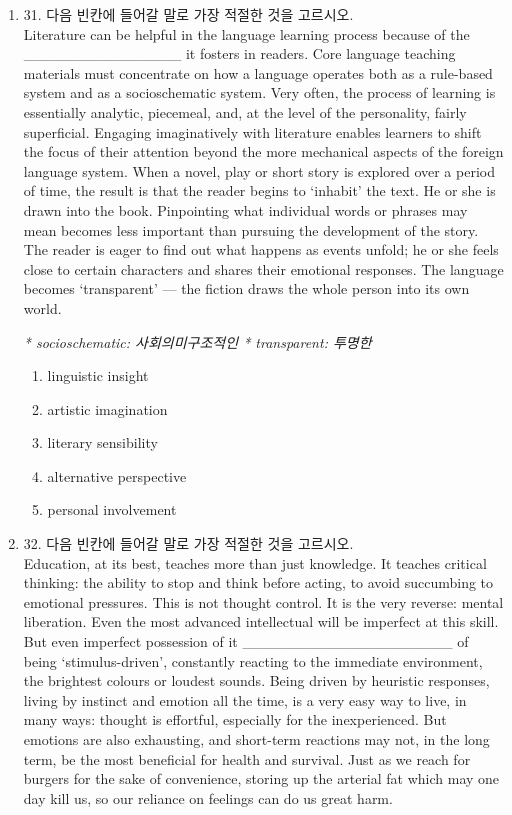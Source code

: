 \documentclass{article}
\begin{document}
\begin{enumerate}[label=\textbf{Q\arabic*.}]
\item
31. 다음 빈칸에 들어갈 말로 가장 적절한 것을 고르시오.
\\
Literature can be helpful in the language learning process because of the _______________ it fosters in readers. Core language teaching materials must concentrate on how a language operates both as a rule-based system and as a socioschematic system. Very often, the process of learning is essentially analytic, piecemeal, and, at the level of the personality, fairly superficial. Engaging imaginatively with literature enables learners to shift the focus of their attention beyond the more mechanical aspects of the foreign language system. When a novel, play or short story is explored over a period of time, the result is that the reader begins to ‘inhabit’ the text. He or she is drawn into the book. Pinpointing what individual words or phrases may mean becomes less important than pursuing the development of the story. The reader is eager to find out what happens as events unfold; he or she feels close to certain characters and shares their emotional responses. The language becomes ‘transparent’ — the fiction draws the whole person into its own world.

\textit{* socioschematic: 사회의미구조적인 \quad ** transparent: 투명한}

\begin{enumerate}
  \item linguistic insight
  \item artistic imagination
  \item literary sensibility
  \item alternative perspective
  \item personal involvement
\end{enumerate}

\item
32. 다음 빈칸에 들어갈 말로 가장 적절한 것을 고르시오.
\\
Education, at its best, teaches more than just knowledge. It teaches critical thinking: the ability to stop and think before acting, to avoid succumbing to emotional pressures. This is not thought control. It is the very reverse: mental liberation. Even the most advanced intellectual will be imperfect at this skill. But even imperfect possession of it ____________________ of being ‘stimulus-driven’, constantly reacting to the immediate environment, the brightest colours or loudest sounds. Being driven by heuristic responses, living by instinct and emotion all the time, is a very easy way to live, in many ways: thought is effortful, especially for the inexperienced. But emotions are also exhausting, and short-term reactions may not, in the long term, be the most beneficial for health and survival. Just as we reach for burgers for the sake of convenience, storing up the arterial fat which may one day kill us, so our reliance on feelings can do us great harm.


\end{enumerate}
\end{document}
